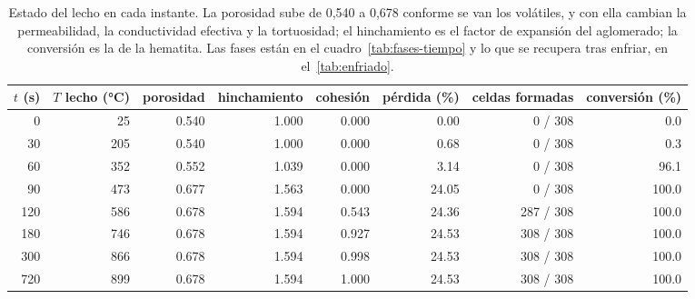 \begin{table}[h]
\centering\small
\begin{tabular}{rrrrrrrr}
\toprule
$t$ (\si{\second}) & $T$ lecho (\si{\celsius}) & porosidad & hinchamiento & cohesión & pérdida (\%) & celdas formadas & conversión (\%) \\
\midrule
0 & \num{25} & \num{0.540} & \num{1.000} & \num{0.000} & \num{0.00} & 0 / 308 & \num{0.0} \\
30 & \num{205} & \num{0.540} & \num{1.000} & \num{0.000} & \num{0.68} & 0 / 308 & \num{0.3} \\
60 & \num{352} & \num{0.552} & \num{1.039} & \num{0.000} & \num{3.14} & 0 / 308 & \num{96.1} \\
90 & \num{473} & \num{0.677} & \num{1.563} & \num{0.000} & \num{24.05} & 0 / 308 & \num{100.0} \\
120 & \num{586} & \num{0.678} & \num{1.594} & \num{0.543} & \num{24.36} & 287 / 308 & \num{100.0} \\
180 & \num{746} & \num{0.678} & \num{1.594} & \num{0.927} & \num{24.53} & 308 / 308 & \num{100.0} \\
300 & \num{866} & \num{0.678} & \num{1.594} & \num{0.998} & \num{24.53} & 308 / 308 & \num{100.0} \\
720 & \num{899} & \num{0.678} & \num{1.594} & \num{1.000} & \num{24.53} & 308 / 308 & \num{100.0} \\
\bottomrule
\end{tabular}
\caption{Estado del lecho en cada instante. La porosidad sube de 0,540 a 0,678 conforme se van los volátiles, y con ella cambian la permeabilidad, la conductividad efectiva y la tortuosidad; el hinchamiento es el factor de expansión del aglomerado; la conversión es la de la hematita. Las fases están en el cuadro~\ref{tab:fases-tiempo} y lo que se recupera tras enfriar, en el~\ref{tab:enfriado}.}
\end{table}
